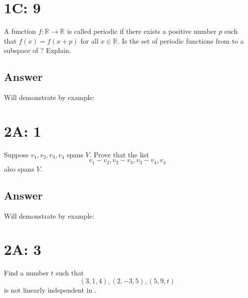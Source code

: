 \documentclass[
	12pt, %
]{fphw}
\newcommand\R[1]{\text{$\mathbb{R}^{#1}$}}
\begin{document}
\section*{1C: 9}

\begin{problem}
A function $f : \R{} \to \R{}$ is called periodic if there exists a positive number $p$ such that $f(x) = f(x + p)$ for all $x \in \R{}$. Is the set of periodic functions from \R{} to \R{} a subspace of \R{\R{}}? Explain.\end{problem}


\subsection*{Answer} Will demonstrate by example:\\



\section*{2A: 1}

\begin{problem}
Suppose $v_1, v_2,  v_3, v_4$ spans $V$. Prove that the list
$$v_1-v_2, v_2 - v_3, v_3-v_4, v_4$$
also spans $V$.

\end{problem}


\subsection*{Answer} Will demonstrate by example:\\



\section*{2A: 3}

\begin{problem}
Find a number $t$ such that 
$$(3,1,4), (2,-3,5), (5,9,t)$$
is not linearly independent in \R{3}.

\end{problem}
\end{document}
